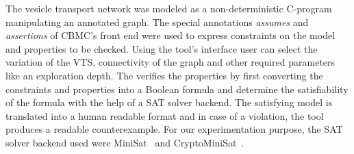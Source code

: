 %
%	
The vesicle transport network was modeled as a non-deterministic C-program manipulating an annotated graph. 
%
The special annotations \textit{assumes} and \textit{assertions} of CBMC's front end were used to express constraints on the model and properties to be checked. 
%
%		
Using the tool's interface user can select the variation of the VTS, connectivity of the graph and other required parameters like an exploration depth.
%
The {\sattool} verifies the properties by first converting the constraints and properties into a Boolean formula and determine the satisfiability of the formula with the help of a SAT solver backend.
%
The satisfying model is translated into a human readable format and in case of a violation, the tool produces a readable counterexample.
For our experimentation purpose, the SAT solver backend used were MiniSat~\cite{sorensson2005minisat} and CryptoMiniSat~\cite{soos2016cryptominisat}.


